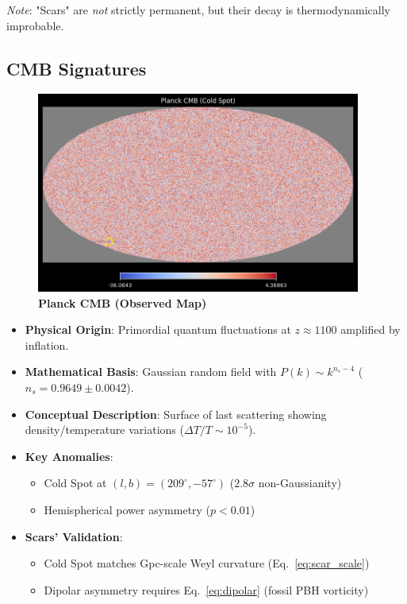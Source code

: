 \documentclass{article}
\begin{document}
\textit{Note}: "Scars" are \textit{not} strictly permanent, but their decay is thermodynamically improbable.

\subsection{CMB Signatures}
\FloatBarrier
\label{subsec:cmb_signatures}

\begin{figure}[H]
    \centering
    \includegraphics[width=0.95\textwidth]{figures/planck_cmb.png}
    \caption{
        \textbf{Planck CMB (Observed Map)}
    }
    \label{fig:planck_cmb}
\end{figure}

\begin{tcolorbox}[colback=boxnormal,colframe=blue!50!black,title=\textbf{Planck CMB Analysis}]
\begin{itemize}
    \item \textbf{Physical Origin}: Primordial quantum fluctuations at $z\approx1100$ amplified by inflation.
    \item \textbf{Mathematical Basis}: Gaussian random field with $P(k)\sim k^{n_s-4}$ ($n_s=0.9649\pm0.0042$).
    \item \textbf{Conceptual Description}: Surface of last scattering showing density/temperature variations ($\Delta T/T\sim10^{-5}$).
    \item \textbf{Key Anomalies}: 
        \begin{itemize}
            \item Cold Spot at $(l,b)=(209^\circ,-57^\circ)$ ($2.8\sigma$ non-Gaussianity)
            \item Hemispherical power asymmetry ($p<0.01$)
        \end{itemize}
    \item \textbf{Scars' Validation}: 
        \begin{itemize}
            \item Cold Spot matches Gpc-scale Weyl curvature (Eq.~\ref{eq:scar_scale})
            \item Dipolar asymmetry requires Eq.~\ref{eq:dipolar} (fossil PBH vorticity)
        \end{itemize}
\end{itemize}
\end{tcolorbox}
\end{document}
